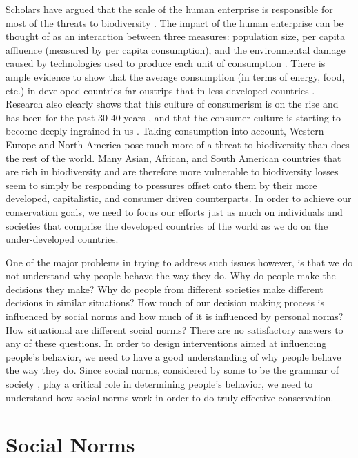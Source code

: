\documentclass[rutwik_proposal.tex]{subfiles}
\begin{document}
Scholars have argued that the scale of the human enterprise is responsible for most of the threats to biodiversity \cite{Ehrlich94}. The impact of the human enterprise can be thought of as an interaction between three measures: population size, per capita affluence (measured by per capita consumption), and the environmental damage caused by technologies used to produce each unit of consumption \cite{Ehrlich71}. There is ample evidence to show that the average consumption (in terms of energy, food, etc.) in developed countries far oustrips that in less developed countries \cite{UScons08, Lenzen99}. Research also clearly shows that this culture of consumerism is on the rise and has been for the past 30-40 years \cite{Schor99}, and that the consumer culture is starting to become deeply ingrained in us \cite{Schor04}. Taking consumption into account, Western Europe and North America pose much more of a threat to biodiversity than does the rest of the world. Many Asian, African, and South American countries that are rich in biodiversity and are therefore more vulnerable to biodiversity losses seem to simply be responding to pressures offset onto them by their more developed, capitalistic, and consumer driven counterparts. In order to achieve our conservation goals, we need to focus our efforts just as much on individuals and societies that comprise the developed countries of the world as we do on the under-developed countries.

One of the major problems in trying to address such issues however, is that we do not understand why people behave the way they do. Why do people make the decisions they make? Why do people from different societies make different decisions in similar situations? How much of our decision making process is influenced by social norms and how much of it is influenced by personal norms? How situational are different social norms? There are no satisfactory answers to any of these questions. In order to design interventions aimed at influencing people's behavior, we need to have a good understanding of why people behave the way they do. Since social norms, considered by some to be the grammar of society \cite{Bicchieri05}, play a critical role in determining people's behavior, we need to understand how social norms work in order to do truly effective conservation.

\section{Social Norms}\label{sec:norms}
\end{document}

